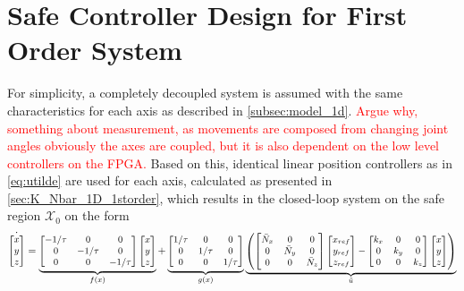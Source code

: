 \section{Safe Controller Design for First Order System}
For simplicity, a completely decoupled system is assumed with the same characteristics for each axis as described in \autoref{subsec:model_1d}. \textcolor{red}{Argue why, something about measurement, as movements are composed from changing joint angles obviously the axes are coupled, but it is also dependent on the low level controllers on the FPGA.} Based on this, identical linear position controllers as in \autoref{eq:utilde} are used for each axis, calculated as presented in \autoref{sec:K_Nbar_1D_1storder}, which results in the closed-loop system on the safe region $\mathcal{X}_0$ on the form
\begin{equation}\label{eq:3D_sys_static}
\small
\dot{\begin{bmatrix}
	x\\y\\z
	\end{bmatrix}} =
\underbrace{\begin{bmatrix}
	-1/\tau & 0 & 0\\0 & -1/\tau & 0 \\ 0 & 0 & -1/\tau
	\end{bmatrix}
	\begin{bmatrix}
	x\\y\\z
	\end{bmatrix}}_{f(x)} +
\underbrace{\begin{bmatrix}
	1/\tau& 0 & 0 \\ 0& 1/\tau & 0 \\0& 0& 1/\tau
	\end{bmatrix}}_{g(x)}
\underbrace{\left(\begin{bmatrix}
	\bar{N}_x & 0 & 0 \\0 & \bar{N}_y & 0 \\0& 0& \bar{N}_z
	\end{bmatrix}
	\begin{bmatrix}
	x_{ref}\\y_{ref}\\z_{ref}
	\end{bmatrix}
	-
	\begin{bmatrix}
	k_x & 0 & 0 \\0 & k_y & 0 \\0& 0&  k_z
	\end{bmatrix}
	\begin{bmatrix}
	x\\y\\z
	\end{bmatrix}\right)}_{\tilde{u}}
\end{equation}

